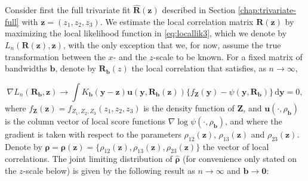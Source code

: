 \documentclass[
  12pt,
  letterpaper]{article}
\newcommand{\Z}{\bm{Z}}
\newcommand{\z}{\bm{z}}
\newcommand{\y}{\bm{y}}
\newcommand{\fu}{\bm{u}}
\newcommand{\R}{\bm{R}}
\newcommand{\hR}{\widehat{\bm{R}}}
\newcommand{\frho}{\bm{\rho}}
\newcommand{\hfrho}{\widehat{\bm{\rho}}}
\newcommand{\hh}{\bm{b}}
\theoremstyle{definition}
\theoremstyle{definition}
\theoremstyle{definition}
\theoremstyle{remark}
\begin{document}
Consider first the full trivariate fit \(\hR(\z)\) described in Section \ref{chap:trivariate-full} with \(\z = (z_1,z_2,z_3)\). We estimate the local correlation matrix \(\R(\z)\) by maximizing the local likelihood function in \eqref{eq:locallik3}, which we denote by \(L_n(\R(\z), \z)\), with the only exception that we, for now, assume the true transformation between the \(x\)- and the \(z\)-scale to be known. For a fixed matrix of bandwidths \(\hh\), denote by \(\R_{\hh}(z)\) the local correlation that satisfies, as \(n \rightarrow \infty\),

\begin{equation}
\nabla L_n(\R_{\hh}, \z) \rightarrow \int K_{\hh}(\y - \z)\fu(\y, \R_{\hh}(\z))\{f_{\Z}(\y) - \psi(\y, \R_{\hh})\}\,\textrm{d}\y = 0,
\label{eq:popfixedh3}
\end{equation}
where \(f_{\Z}(\z) = f_{Z_1,Z_2,Z_3}(z_1,z_2,z_3)\) is the density function of \(\Z\), and \(\fu(\cdot, \rho_{\hh})\) is the column vector of local score functions \(\nabla \log\psi(\cdot, \rho_{\hh})\), and where the gradient is taken with respect to the parameters \(\rho_{12}(\z)\), \(\rho_{13}(\z)\) and \(\rho_{23}(\z)\). Denote by \(\frho = \frho(\z) = \{\rho_{12}(\z), \rho_{13}(\z), \rho_{23}(\z)\}\) the vector of local correlations. The joint limiting distribution of \(\hfrho\) (for convenience only stated on the \(z\)-scale below) is given by the following result as \(n \rightarrow \infty\) and \(\hh \rightarrow \bm{0}\):
\end{document}
